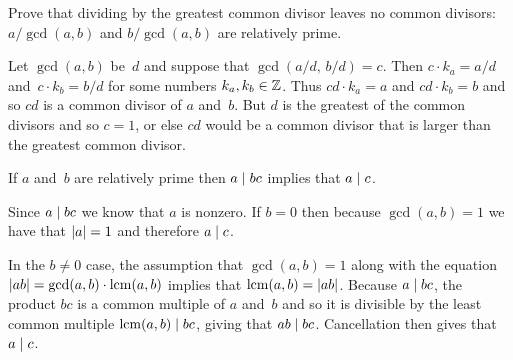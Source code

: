 \documentclass{ibl}  %
\begin{document}
\begin{euclidproof}
\begin{problem}  \label{ex:EuclidsLemma}
\begin{exes} 
\begin{exercise}
  Prove that
  dividing by the greatest common divisor leaves no common divisors:
  $a/\gcd(a,b)$ and $b/\gcd(a,b)$ are relatively prime.
\end{exercise}
\begin{answer}
  Let $\gcd(a,b)$ be~$d$ and suppose that $\gcd(a/d,\,b/d)=c$.
  Then $c\cdot k_a=a/d$ and~$c\cdot k_b=b/d$ for some numbers $k_a, k_b\in\mathbb{Z}$.
  Thus $cd\cdot k_a=a$ and $cd\cdot k_b=b$ and so $cd$ is a common divisor
  of $a$ and~$b$. 
  But $d$ is the greatest of the common divisors and so $c=1$, 
  or else $cd$ would be a common divisor
  that is larger than the greatest common divisor.      
\end{answer}
\begin{exercise}   
  If $a$ and~$b$ are relatively prime then $a\mid bc$ implies that 
  $a\mid c$.
\end{exercise}
\begin{answer}
  Since $a\mid bc$ we know that $a$ is nonzero.
  If $b=0$ then because $\gcd(a,b)=1$ we have that $\lvert a\rvert=1$ 
  and therefore $a\mid c$.

  In the $b\neq 0$ case, the assumption that $\gcd(a,b)=1$ 
  along with the equation $\lvert ab\rvert=\gcd(a,b)\cdot\operatorname{lcm}(a,b)$ implies that 
  $\operatorname{lcm}(a,b)=\lvert ab\rvert$.
  Because $a\mid bc$, the product $bc$ is a common 
  multiple of $a$ and~$b$ and so it is divisible by the least common multiple
  $\operatorname{lcm}(a,b)\mid bc$, giving that $ab\mid bc$.  
  Cancellation then gives that $a\mid c$.  
\end{answer}
\end{exes}


\end{problem}
\end{euclidproof}
\end{document}

